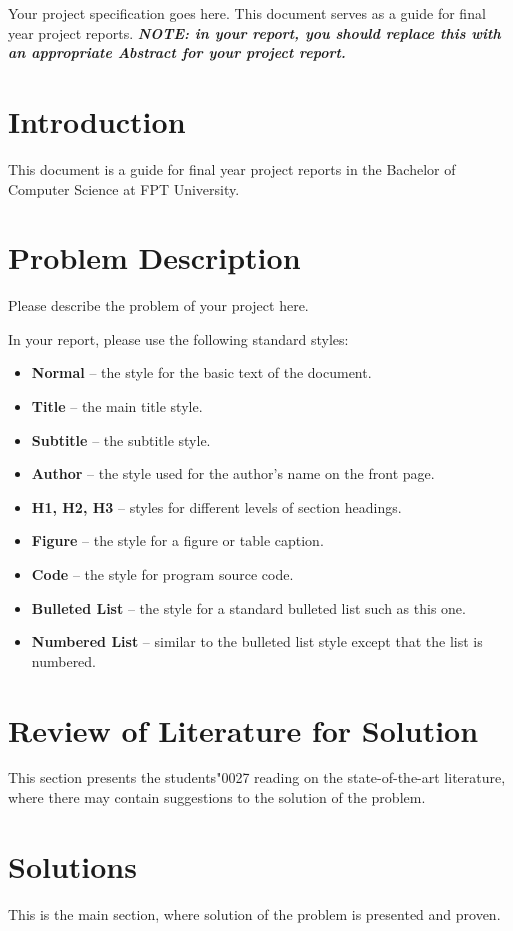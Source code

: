 \documentclass[letterpaper,arabicchapters,nochapterbreak]{fptthesis}
\begin{document}
\SupervisorTitlePage
\frontmatter
{}
Your project specification goes here.
This document serves as a guide for final year project reports. \textbf{\textit{NOTE: in your report, you should replace this with an appropriate Abstract for your project report.}}
\TableOfContents
\mainmatter
\chapter{Introduction}
This document is a guide for final year project reports in the Bachelor of Computer Science at FPT University.
\chapter{Problem Description}
Please describe the problem of your project here.

In your report, please use the following standard styles:
\begin{itemize}
\item \textbf{Normal} – the style for the basic text of the document.
\item \textbf{Title} – the main title style.
\item \textbf{Subtitle} – the subtitle style.
\item \textbf{Author} – the style used for the author's name on the front page.
\item \textbf{H1, H2, H3} – styles for different levels of section headings.
\item \textbf{Figure} – the style for a figure or table caption.
\item \textbf{Code} – the style for program source code.
\item \textbf{Bulleted List} – the style for a standard bulleted list such as this one.
\item \textbf{Numbered List} – similar to the bulleted list style except that the list is numbered.
\end{itemize}
\chapter{Review of Literature for Solution}
This section presents the students{\char"0027} reading on the state-of-the-art literature, where there may contain suggestions to the solution of the problem.
\chapter{Solutions}
This is the main section, where solution of the problem is presented and proven.
\end{document}
